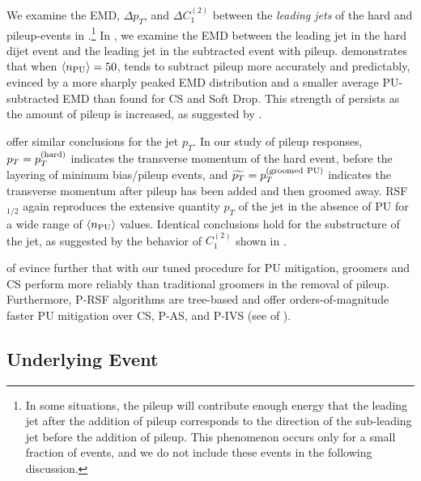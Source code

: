 We examine the EMD, \(\Delta p_T\), and \(\Delta C_1^{(2)}\) between the \textit{leading jets} of the hard and pileup-events in .\footnote{
In some situations, the pileup will contribute enough energy that the leading jet after the addition of pileup corresponds to the direction of the sub-leading jet before the addition of pileup.
%
This phenomenon occurs only for a small fraction of events, and we do not include these events in the following discussion.
}
%
In , we examine the EMD between the leading jet in the hard dijet event and the leading jet in the subtracted event with pileup.
%
 demonstrates that when \(\langle n_{\rm PU} \rangle=50\),  tends to subtract pileup more accurately and predictably, evinced by a more sharply peaked EMD distribution and a smaller average PU-subtracted EMD than found for CS and Soft Drop.
%
This strength of  persists as the amount of pileup is increased, as suggested by .

 offer similar conclusions for the jet \(p_T\).
%
In our study of pileup responses, \(p_T = p_T^{\rm(hard)}\) indicates the transverse momentum of the hard event, before the layering of minimum bias/pileup events, and \(\widetilde{p_T} = p_T^{\rm (groomed~PU)}\) indicates the transverse momentum after pileup has been added and then groomed away.
%
RSF\(_{1/2}\) again reproduces the extensive quantity \(p_T\) of the jet in the absence of PU for a wide range of \(\langle n_{\rm PU} \rangle\) values.
%
Identical conclusions hold for the substructure of the jet, as suggested by the behavior of \(C_1^{(2)}\) shown in .

 of  evince further that with our tuned procedure for PU mitigation, \PIRANHA{} groomers and CS perform more reliably than traditional groomers in the removal of pileup.
%
Furthermore, P-RSF algorithms are tree-based and offer orders-of-magnitude faster PU mitigation over CS, P-AS, and P-IVS (see  of ).


\subsection{Underlying Event}
\label{sec:ue}

